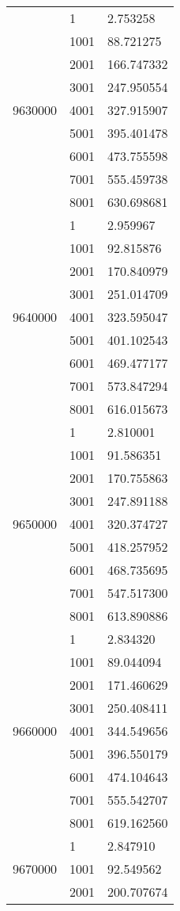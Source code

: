 \begin{table}[htb!]
\begin{tabular}{lll}
\multirow[c]{9}{*}{9630000} & 1 & 2.753258 \\
 & 1001 & 88.721275 \\
 & 2001 & 166.747332 \\
 & 3001 & 247.950554 \\
 & 4001 & 327.915907 \\
 & 5001 & 395.401478 \\
 & 6001 & 473.755598 \\
 & 7001 & 555.459738 \\
 & 8001 & 630.698681 \\
\multirow[c]{9}{*}{9640000} & 1 & 2.959967 \\
 & 1001 & 92.815876 \\
 & 2001 & 170.840979 \\
 & 3001 & 251.014709 \\
 & 4001 & 323.595047 \\
 & 5001 & 401.102543 \\
 & 6001 & 469.477177 \\
 & 7001 & 573.847294 \\
 & 8001 & 616.015673 \\
\multirow[c]{9}{*}{9650000} & 1 & 2.810001 \\
 & 1001 & 91.586351 \\
 & 2001 & 170.755863 \\
 & 3001 & 247.891188 \\
 & 4001 & 320.374727 \\
 & 5001 & 418.257952 \\
 & 6001 & 468.735695 \\
 & 7001 & 547.517300 \\
 & 8001 & 613.890886 \\
\multirow[c]{9}{*}{9660000} & 1 & 2.834320 \\
 & 1001 & 89.044094 \\
 & 2001 & 171.460629 \\
 & 3001 & 250.408411 \\
 & 4001 & 344.549656 \\
 & 5001 & 396.550179 \\
 & 6001 & 474.104643 \\
 & 7001 & 555.542707 \\
 & 8001 & 619.162560 \\
\multirow[c]{9}{*}{9670000} & 1 & 2.847910 \\
 & 1001 & 92.549562 \\
 & 2001 & 200.707674 \\

\end{tabular}
\end{table}

